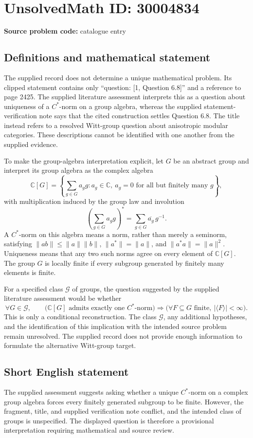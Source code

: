 \documentclass[11pt]{article}
\newcommand{\C}{\mathbb{C}}
\begin{document}
\section*{UnsolvedMath ID: 30004834}
\textbf{Source problem code:} catalogue entry
\subsection{Definitions and mathematical statement}
The supplied record does not determine a unique mathematical problem. Its clipped statement contains only ``question: [1, Question 6.8]'' and a reference to page 2425. The supplied literature assessment interprets this as a question about uniqueness of a \(C^*\)-norm on a group algebra, whereas the supplied statement-verification note says that the cited construction settles Question 6.8. The title instead refers to a resolved Witt-group question about anisotropic modular categories. These descriptions cannot be identified with one another from the supplied evidence.

To make the group-algebra interpretation explicit, let \(G\) be an abstract group and interpret its group algebra as the complex algebra
\[
\C[G]=\left\{\sum_{g\in G}a_g g : a_g\in\C,\ a_g=0\text{ for all but finitely many }g\right\},
\]
with multiplication induced by the group law and involution
\[
\left(\sum_{g\in G}a_g g\right)^*=\sum_{g\in G}\overline{a_g}\,g^{-1}.
\]
A \(C^*\)-norm on this algebra means a norm, rather than merely a seminorm, satisfying \(\|ab\|\leq\|a\|\|b\|\), \(\|a^*\|=\|a\|\), and \(\|a^*a\|=\|a\|^2\). Uniqueness means that any two such norms agree on every element of \(\C[G]\). The group \(G\) is locally finite if every subgroup generated by finitely many elements is finite.

For a specified class \(\mathcal G\) of groups, the question suggested by the supplied literature assessment would be whether
\[
\forall G\in\mathcal G,\qquad
\bigl(\C[G]\text{ admits exactly one }C^*\text{-norm}\bigr)
\Longrightarrow
\bigl(\forall F\subseteq G\text{ finite},\ |\langle F\rangle|<\infty\bigr).
\]
This is only a conditional reconstruction. The class \(\mathcal G\), any additional hypotheses, and the identification of this implication with the intended source problem remain unresolved. The supplied record does not provide enough information to formulate the alternative Witt-group target.
\subsection{Short English statement}
The supplied assessment suggests asking whether a unique \(C^*\)-norm on a complex group algebra forces every finitely generated subgroup to be finite. However, the fragment, title, and supplied verification note conflict, and the intended class of groups is unspecified. The displayed question is therefore a provisional interpretation requiring mathematical and source review.
\end{document}
